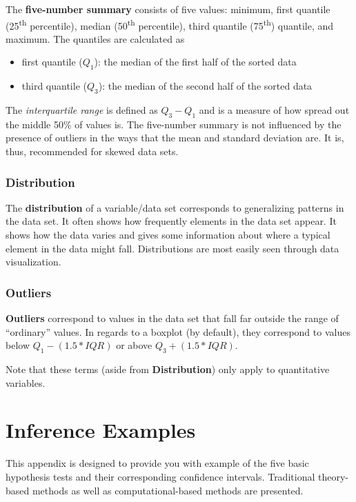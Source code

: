 \documentclass[]{tufte-book}
\providecommand{\tightlist}{%
  \setlength{\itemsep}{0pt}\setlength{\parskip}{0pt}}
\begin{document}
The \textbf{five-number summary} consists of five values: minimum, first
quantile (25\textsuperscript{th} percentile), median
(50\textsuperscript{th} percentile), third quantile
(75\textsuperscript{th}) quantile, and maximum. The quantiles are
calculated as

\begin{itemize}
\tightlist
\item
  first quantile (\(Q_1\)): the median of the first half of the sorted
  data
\item
  third quantile (\(Q_3\)): the median of the second half of the sorted
  data
\end{itemize}

The \emph{interquartile range} is defined as \(Q_3 - Q_1\) and is a
measure of how spread out the middle 50\% of values is. The five-number
summary is not influenced by the presence of outliers in the ways that
the mean and standard deviation are. It is, thus, recommended for skewed
data sets.

\subsection{Distribution}\label{distribution}

The \textbf{distribution} of a variable/data set corresponds to
generalizing patterns in the data set. It often shows how frequently
elements in the data set appear. It shows how the data varies and gives
some information about where a typical element in the data might fall.
Distributions are most easily seen through data visualization.

\subsection{Outliers}\label{outliers}

\textbf{Outliers} correspond to values in the data set that fall far
outside the range of ``ordinary'' values. In regards to a boxplot (by
default), they correspond to values below \(Q_1 - (1.5 * IQR)\) or above
\(Q_3 + (1.5 * IQR)\).

Note that these terms (aside from \textbf{Distribution}) only apply to
quantitative variables.

\chapter{Inference Examples}\label{appendixB}

This appendix is designed to provide you with example of the five basic
hypothesis tests and their corresponding confidence intervals.
Traditional theory-based methods as well as computational-based methods
are presented.
\end{document}

